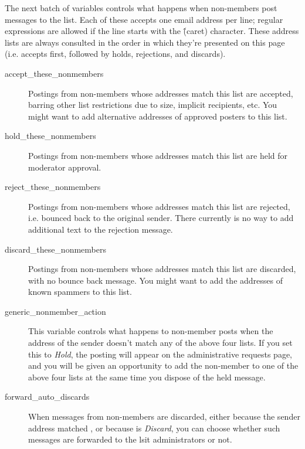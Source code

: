 \documentclass{howto}
\begin{document}
The next batch of variables controls what happens when non-members
post messages to the list.  Each of these accepts one email address
per line; regular expressions are allowed if the line starts with the
\^ (caret) character.  These address lists are always consulted in the
order in which they're presented on this page (i.e. accepts first,
followed by holds, rejections, and discards).

\begin{description}
\item[accept_these_nonmembers]
    Postings from non-members whose addresses match this list are
    accepted, barring other list restrictions due to size, implicit
    recipients, etc.  You might want to add alternative addresses of
    approved posters to this list.

\item[hold_these_nonmembers]
    Postings from non-members whose addresses match this list are
    held for moderator approval.

\item[reject_these_nonmembers]
    Postings from non-members whose addresses match this list are
    rejected, i.e. bounced back to the original sender.  There
    currently is no way to add additional text to the rejection
    message.

\item[discard_these_nonmembers]
    Postings from non-members whose addresses match this list are
    discarded, with no bounce back message.  You might want to add the
    addresses of known spammers to this list.

\item[generic_nonmember_action]
    This variable controls what happens to non-member posts when the
    address of the sender doesn't match any of the above four lists.
    If you set this to \emph{Hold}, the posting will appear on the
    administrative requests page, and you will be given an opportunity
    to add the non-member to one of the above four lists at the same
    time you dispose of the held message.

\item[forward_auto_discards]
    When messages from non-members are discarded, either because the
    sender address matched , or because
     is \emph{Discard}, you can choose
    whether such messages are forwarded to the lsit administrators or
    not.
\end{description}
\end{document}
